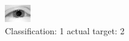 \begin{figure}[h!]
\begin{center}
\includegraphics[width=0.60\columnwidth]{figures/ID2346_class_1_target_2.png}
\end{center}
\caption{ Classification: 1 actual target: 2}
\label{fig:ID2346_class_1_target_2}
\end{figure}
